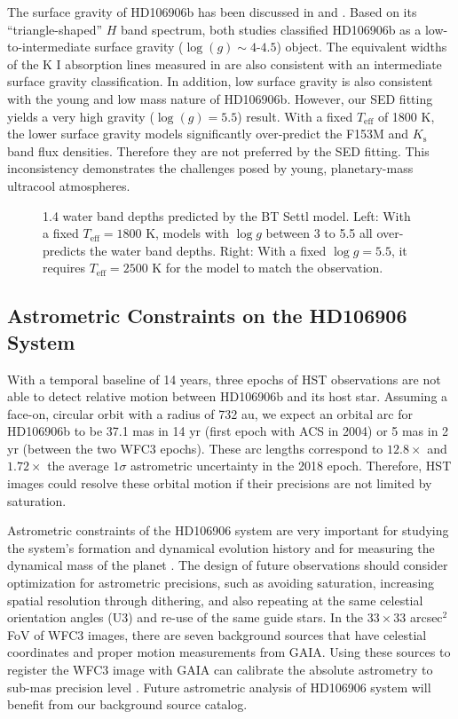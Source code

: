 \documentclass[twocolumn]{aastex62}
\newcommand{\logg}{\ensuremath{\log(g)}\xspace}
\begin{document}
 The surface gravity of HD106906b has been discussed in \citet{Bailey2013} and \citet{Daemgen2017}.  Based on its ``triangle-shaped'' $H$ band spectrum, both studies classified HD106906b as a low-to-intermediate surface gravity ($\logg\sim4\mbox{-}4.5$) object. The equivalent widths of the K I absorption lines measured in \citet{Daemgen2017} are also consistent with an intermediate surface gravity classification. In addition, low surface gravity is also consistent with the young and low mass nature of HD106906b. However, our SED fitting yields a very high gravity ($\logg=5.5$) result. With a fixed $T_{\mathrm{eff}}$ of 1800 K, the lower surface gravity models significantly over-predict the F153M and $K_{\mathrm{s}}$ band flux {densities}. Therefore they are not preferred by the SED fitting. This inconsistency demonstrates the challenges posed by young, planetary-mass ultracool atmospheres.

\begin{figure}
  \centering
  \caption{1.4 \micron{} water band depths predicted by the BT Settl model. Left: With a fixed $T_{\mathrm{eff}}=1800$ K, models with $\log g$ between 3 to 5.5 all over-predicts the water band depths. Right: With a fixed $\log g=5.5$, it requires $T_{\mathrm{eff}}=2500$ K for the model to match the observation.}
  \label{fig:waterdepth}
\end{figure}

\subsection{Astrometric Constraints on the  HD106906 System}
\label{sec:HD106906:astrometry-discussion}
With a temporal baseline of 14 years, three epochs of HST observations are not able to detect relative motion between HD106906b and its host star. Assuming a face-on, circular orbit with a radius of 732 au, we expect an orbital arc for HD106906b to be 37.1 mas in 14 yr (first epoch with ACS in 2004) or 5 mas in 2 yr (between the two WFC3 epochs). These arc lengths correspond to $12.8\times$ and $1.72\times$ the average $1\sigma$ astrometric uncertainty in the 2018 epoch. Therefore, HST images could resolve these orbital motion if their precisions are not limited by saturation.

Astrometric constraints of the HD106906 system are very important for studying the system's formation and dynamical evolution history \citep[e.g., ][]{DeRosa2019} and for measuring the dynamical mass of the planet \citep[e.g.,][]{Snellen2018,Dupuy2019}. The design of future observations should consider optimization for astrometric precisions, such as avoiding saturation, increasing spatial resolution through dithering, and also repeating at the same celestial orientation angles (U3) and re-use of the same guide stars. In the $33\times33$ arcsec$^{2}$ FoV of WFC3 images, there are seven background sources that have {celestial} coordinates and proper motion measurements from GAIA. Using these sources to register the WFC3 image with GAIA can calibrate the absolute astrometry to sub-mas precision level \citep{Bedin2018}. Future astrometric analysis of HD106906 system will  benefit from our background source catalog.
\end{document}
